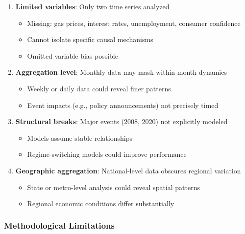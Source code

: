 \documentclass[12pt]{article}
\begin{document}
\begin{enumerate}
    \item \textbf{Limited variables}: Only two time series analyzed
    \begin{itemize}
        \item Missing: gas prices, interest rates, unemployment, consumer confidence
        \item Cannot isolate specific causal mechanisms
        \item Omitted variable bias possible
    \end{itemize}

    \item \textbf{Aggregation level}: Monthly data may mask within-month dynamics
    \begin{itemize}
        \item Weekly or daily data could reveal finer patterns
        \item Event impacts (e.g., policy announcements) not precisely timed
    \end{itemize}

    \item \textbf{Structural breaks}: Major events (2008, 2020) not explicitly modeled
    \begin{itemize}
        \item Models assume stable relationships
        \item Regime-switching models could improve performance
    \end{itemize}

    \item \textbf{Geographic aggregation}: National-level data obscures regional variation
    \begin{itemize}
        \item State or metro-level analysis could reveal spatial patterns
        \item Regional economic conditions differ substantially
    \end{itemize}
\end{enumerate}

\subsubsection*{Methodological Limitations}
\end{document}
